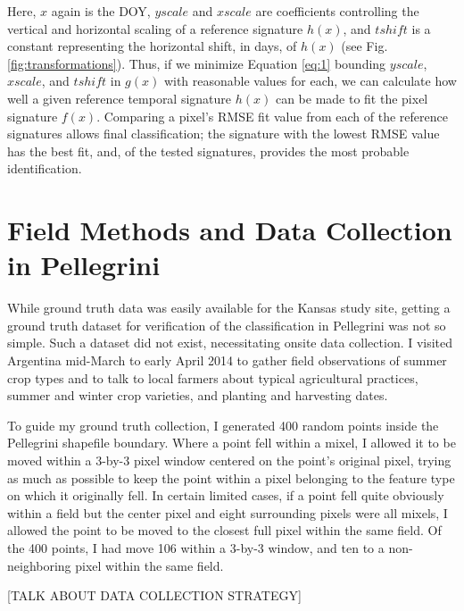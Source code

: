 Here, $x$ again is the DOY, $yscale$ and  $xscale$ are coefficients controlling the vertical and horizontal scaling of a reference signature $h(x)$, and $tshift$ is a constant representing the horizontal shift, in days, of $h(x)$ (see Fig. \ref{fig:transformations}). Thus, if we minimize Equation \ref{eq:1} bounding $yscale$, $xscale$, and $tshift$  in $g(x)$ with reasonable values for each, we can calculate how well a given reference temporal signature $h(x)$ can be made to fit the pixel signature $f(x)$. Comparing a pixel's RMSE fit value from each of the reference signatures allows final classification; the signature with the lowest RMSE value has the best fit, and, of the tested signatures, provides the most probable identification.

\section{Field Methods and Data Collection in Pellegrini}

While ground truth data was easily available for the Kansas study site, getting a ground truth dataset for verification of the classification in Pellegrini was not so simple. Such a dataset did not exist, necessitating onsite data collection. I visited Argentina mid-March to early April 2014 to gather field observations of summer crop types and to talk to local farmers about typical agricultural practices, summer and winter crop varieties, and planting and harvesting dates.

To guide my ground truth collection, I generated 400 random points inside the Pellegrini shapefile boundary. Where a point fell within a mixel, I allowed it to be moved within a 3-by-3 pixel window centered on the point's original pixel, trying as much as possible to keep the point within a pixel belonging to the feature type on which it originally fell. In certain limited cases, if a point fell quite obviously within a field but the center pixel and eight surrounding pixels were all mixels, I allowed the point to be moved to the closest full pixel within the same field. Of the 400 points, I had move 106 within a 3-by-3 window, and ten to a non-neighboring pixel within the same field.

[TALK ABOUT DATA COLLECTION STRATEGY]

































